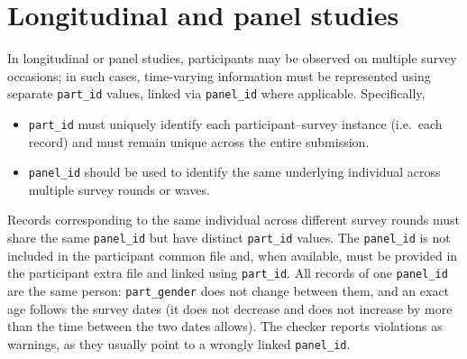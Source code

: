 \documentclass[11pt,a4paper]{article}
\begin{document}
\section{Longitudinal and panel studies}
\label{sec:longitudinal}
   In longitudinal or panel studies, participants may be observed on multiple survey occasions; in such cases, time-varying information must be represented using separate \texttt{part\_id} values, linked via \texttt{panel\_id} where applicable. Specifically,
\begin{itemize}
    \item \texttt{part\_id} must uniquely identify each participant--survey instance (i.e.\ each record) and must remain unique across the entire submission.
    \item \texttt{panel\_id} should be used to identify the same underlying individual across multiple survey rounds or waves.
\end{itemize}

\noindent
Records corresponding to the same individual across different survey rounds must share the same \texttt{panel\_id} but have distinct \texttt{part\_id} values. 
The \texttt{panel\_id} is not included in the participant common file and, when available, must be provided in the participant extra file and linked using \texttt{part\_id}. All records of one \texttt{panel\_id} are the same person: \texttt{part\_gender} does not change between them, and an exact age follows the survey dates (it does not decrease and does not increase by more than the time between the two dates allows). The checker reports violations as warnings, as they usually point to a wrongly linked \texttt{panel\_id}.
\end{document}
